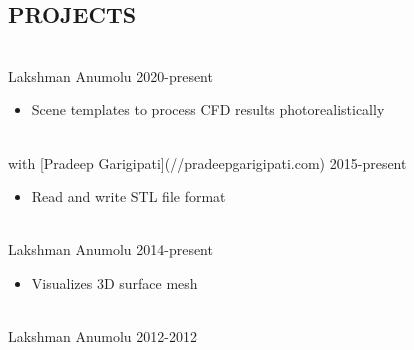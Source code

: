 \documentclass{res}
\begin{document}
\begin{resume}
	\section{\MakeUppercase{Projects}} \vskip 0.15in
	
	\hspace*{-0.25in}{\bf Framework to Photorealistic Render Computational Fluid Dynamics Results} \\
	\hspace*{-0.25in}Lakshman Anumolu \hfill 2020-present
	\begin{itemize}[leftmargin=\parindent]
	\setlength{\itemsep}{0mm} \smallskip
	
	\item Scene templates to process CFD results photorealistically
	\end{itemize}
	
	\hspace*{-0.25in}{\bf MeshIO} \\
	\hspace*{-0.25in}with [Pradeep Garigipati](//pradeepgarigipati.com) \hfill 2015-present
	\begin{itemize}[leftmargin=\parindent]
	\setlength{\itemsep}{0mm} \smallskip
	
	\item Read and write STL file format
	\end{itemize}
	
	\hspace*{-0.25in}{\bf Basic Model Viewer} \\
	\hspace*{-0.25in}Lakshman Anumolu \hfill 2014-present
	\begin{itemize}[leftmargin=\parindent]
	\setlength{\itemsep}{0mm} \smallskip
	
	\item Visualizes 3D surface mesh
	\end{itemize}
	
	\hspace*{-0.25in}{\bf Weak Formulation of Gradient Augmented Level Set Method to Stephan Type Problems} \\
	\hspace*{-0.25in}Lakshman Anumolu \hfill 2012-2012
	\begin{itemize}[leftmargin=\parindent]
	\setlength{\itemsep}{0mm} \smallskip
	

\end{itemize}
\end{resume}
\end{document}
